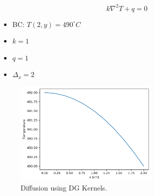 \documentclass[11pt,letterpaper]{article}
\begin{document}
	\begin{equation}
    	k \nabla^2 T + q = 0
	\end{equation}

	\begin{itemize}
		\item BC: $T(2, y) = 490^{\circ}C$
		\item $k = 1$
		\item $q = 1$
		\item $\Delta_x = 2$
	\end{itemize}

	\begin{figure}[htbp!]
		\centering
		\includegraphics[height=5cm]{diff1-ss_across}
		\caption{Diffusion using DG Kernels.}
		\label{fig:diff1-ss}
	\end{figure}

\pagebreak

% 
\end{document}
